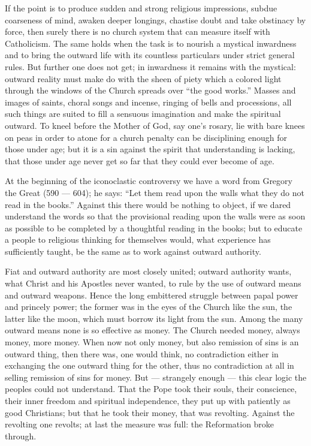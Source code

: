 \documentclass[12pt,a4paper,openany]{book}
\newcommand{\opage}[1]{\marginnote{\footnotesize\textit{[#1]}}}
\begin{document}
If the point is to produce sudden and
strong religious impressions, subdue coarseness of mind, awaken
deeper longings, chastise doubt and take obstinacy
by force, then surely there is no church system that can
measure itself with Catholicism. The same holds
when the task is to nourish a mystical inwardness and
to bring the outward life with its countless particulars
under strict general rules. But further one does not
get; in inwardness it remains with the
mystical: outward reality must make do with the
sheen of piety which a colored light through the windows
of the Church spreads over ``the good works.'' Masses
and images of saints, choral songs and incense, ringing of bells
and processions, all such things are suited to fill
a sensuous imagination and make the spiritual
outward. To kneel before the Mother of God, say one's rosary,
lie with bare knees on peas in order to atone for a
church penalty can be disciplining enough for those under age;
but it is a sin against the spirit that understanding
is lacking, that those under age never get so far that they
could ever become of age.

At the beginning of the iconoclastic controversy we have a word from
Gregory the Great (590 --- 604); he says: ``Let them
\setcounter{footnote}{0}%
\opage{77}read upon the walls what they do not read in the books.''
Against this there would be nothing to object, if we
dared understand the words so that the provisional
reading upon the walls were as soon as possible to be completed
by a thoughtful reading in the books; but to
educate a people to religious thinking for themselves would, what
experience has sufficiently taught, be the same as
to work against outward authority.

Fiat and outward authority are most closely
united; outward authority wants, what
Christ and his Apostles never wanted, to rule by
the use of outward means and outward weapons. Hence
the long embittered struggle between papal power and
princely power; the former was in the eyes of the Church like the sun, the latter
like the moon, which must borrow its light from the sun. Among
the many outward means none is so effective as
money. The Church needed money, always money, more
money. When now not only money, but also remission of sins
is an outward thing, then there was, one would
think, no contradiction either in exchanging the one
outward thing for the other, thus no contradiction at all
in selling remission of sins for money. But --- strangely
enough --- this clear logic the peoples could not
understand. That the Pope took their souls, their conscience,
their inner freedom and spiritual independence, they put
up with patiently as good Christians; but
that he took their money, that was revolting. Against the
revolting one revolts; at last the measure was full:
the Reformation broke through.
\end{document}
